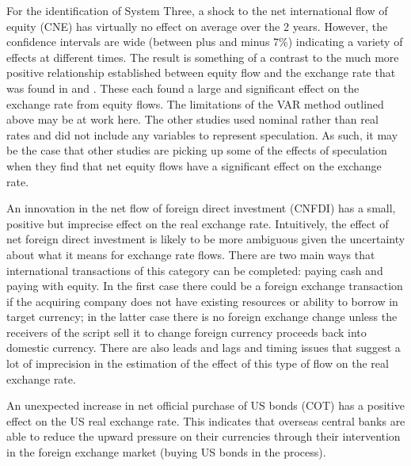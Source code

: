 \documentclass[12pt, a4paper, oneside]{article}\usepackage[]{graphicx}\usepackage[]{color}
\begin{document}
For the identification of System Three, a shock to the net international flow of equity (CNE) has virtually no effect on average over the 2 years.  However, the confidence intervals are wide (between plus and minus 7\%) indicating a variety of effects at different times.    The result is something of a contrast to the much more positive relationship established between equity flow and the exchange rate that was found in \citep{HauEquity} and  \citep{Siourounis2004Capital}.  These each found a large and significant effect on the exchange rate from equity flows.  The limitations of the VAR method outlined above may be at work here.  The other studies used nominal rather than real rates and did not include any variables to represent speculation.  As such, it may be the case that other studies are picking up some of the effects of speculation when they find that net equity flows have a significant effect on the exchange rate.  

An innovation in the net flow of foreign direct investment (CNFDI) has a small, positive but imprecise effect on the real exchange rate.  Intuitively, the effect of net foreign direct investment is likely to be more ambiguous given the uncertainty about what it means for exchange rate flows.  There are two main ways that international transactions of this category can be completed:  paying cash and paying with equity.  In the first case there could be a foreign exchange transaction if the acquiring company does not have existing resources or ability to borrow in target currency; in the latter case there is no foreign exchange change unless the receivers of the script sell it to change foreign currency proceeds back into domestic currency.  There are also leads and lags and timing issues that suggest a lot of imprecision in the estimation of the effect of this type of flow on the real exchange rate.   

An unexpected increase in net official purchase of US bonds (COT) has a positive effect on the US real exchange rate.  This indicates that overseas central banks are able to reduce the  upward pressure on their currencies through their intervention in the foreign exchange market (buying US bonds in the process).  
\end{document}

